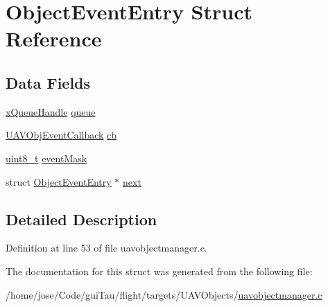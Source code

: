 \hypertarget{struct_object_event_entry}{\section{Object\-Event\-Entry Struct Reference}
\label{struct_object_event_entry}
}
\subsection*{Data Fields}
\begin{DoxyCompactItemize}
\item 
\hyperlink{_common_2_libraries_2_free_r_t_o_s_2_source_2include_2queue_8h_a229037f755b756156e34a440ce134b8b}{x\-Queue\-Handle} \hyperlink{group___u_a_v_ga458a6b3068168aff7f61a922a5011673}{queue}
\item 
\hyperlink{group___u_a_v_ga33d11560e38b56dc904220fb0f785c28}{U\-A\-V\-Obj\-Event\-Callback} \hyperlink{group___u_a_v_ga202f15e5d4be2ca706b2f9ed6fa27d81}{cb}
\item 
\hyperlink{stdint_8h_aba7bc1797add20fe3efdf37ced1182c5}{uint8\-\_\-t} \hyperlink{group___u_a_v_ga7943bff77f5f644659a1cb59d7f0b176}{event\-Mask}
\item 
struct \hyperlink{struct_object_event_entry}{Object\-Event\-Entry} $\ast$ \hyperlink{group___u_a_v_gaf10cb19d61193416975d2cb2c78bf620}{next}
\end{DoxyCompactItemize}


\subsection{Detailed Description}


Definition at line 53 of file uavobjectmanager.\-c.



The documentation for this struct was generated from the following file\-:\begin{DoxyCompactItemize}
\item 
/home/jose/\-Code/gui\-Tau/flight/targets/\-U\-A\-V\-Objects/\hyperlink{uavobjectmanager_8c}{uavobjectmanager.\-c}\end{DoxyCompactItemize}
